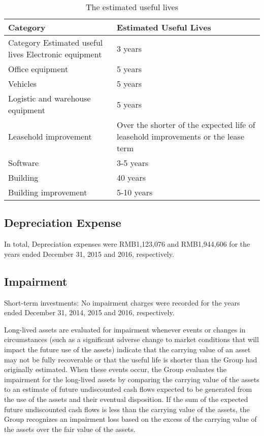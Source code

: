 \begin{table}[H]	
	\begin{center}
		\begin{tabular}{l|p{5cm}}
			\hline
			\textbf{\large{Category}}&\textbf{\large{Estimated Useful Lives}}\\
			\hline
			\rowcolor[gray]{.95}
			Category Estimated useful lives Electronic equipment &	3 years\\
			Office equipment &	5 years\\
			\rowcolor[gray]{.95}
			Vehicles&	5 years\\
			Logistic and warehouse equipment &	5 years\\
			\rowcolor[gray]{.95}
			Leasehold improvement&	Over the shorter of the expected life of leasehold improvements or the lease term\\			
			Software&	3-5 years\\
			\rowcolor[gray]{.95}
			Building &	40 years\\
			Building improvement &	5-10 years\\
		\end{tabular}
	\end{center}
	\caption{The estimated useful lives}\label{table:1}
\end{table}

\subsection{Depreciation Expense}

In total, Depreciation expenses were RMB1,123,076 and RMB1,944,606 for the years ended December 31, 2015 and 2016, respectively.


\subsection{Impairment}
Short-term investments: No impairment charges were recorded for the years ended December 31, 2014, 2015 and 2016, respectively.

Long-lived assets are evaluated for impairment whenever events or changes in circumstances (such as a significant adverse change to market conditions that will impact the future use of the assets) indicate that the carrying value of an asset may not be fully recoverable or that the useful life is shorter than the Group had originally estimated. When these events occur, the Group evaluates the impairment for the long-lived assets by comparing the carrying value of the assets to an estimate of future undiscounted cash flows expected to be generated from the use of the assets and their eventual disposition. If the sum of the expected future undiscounted cash flows is less than the carrying value of the assets, the Group recognizes an impairment loss based on the excess of the carrying value of the assets over the fair value of the assets.

